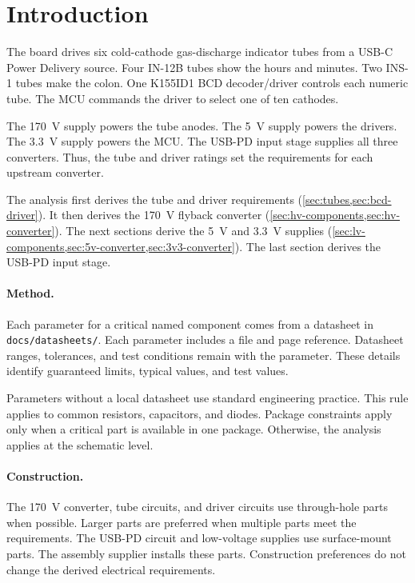 \section{Introduction}
\label{sec:introduction}

The board drives six cold-cathode gas-discharge indicator tubes from a USB-C
Power Delivery source. Four IN-12B tubes show the hours and minutes. Two INS-1
tubes make the colon. One K155ID1 BCD decoder/driver controls each numeric
tube. The MCU commands the driver to select one of ten cathodes.

The 170~V supply powers the tube anodes. The 5~V supply powers the drivers. The
3.3~V supply powers the MCU. The USB-PD input stage supplies all three
converters. Thus, the tube and driver ratings set the requirements for each
upstream converter.

The analysis first derives the tube and driver requirements
(\cref{sec:tubes,sec:bcd-driver}). It then derives the 170~V flyback converter
(\cref{sec:hv-components,sec:hv-converter}). The next sections derive the 5~V
and 3.3~V supplies
(\cref{sec:lv-components,sec:5v-converter,sec:3v3-converter}). The last section
derives the USB-PD input stage.

\paragraph{Method.} Each parameter for a critical named component comes from a
datasheet in \texttt{docs/datasheets/}. Each parameter includes a file and page
reference. Datasheet ranges, tolerances, and test conditions remain with the
parameter. These details identify guaranteed limits, typical values, and test
values.

Parameters without a local datasheet use standard engineering practice. This
rule applies to common resistors, capacitors, and diodes. Package constraints
apply only when a critical part is available in one package. Otherwise, the
analysis applies at the schematic level.

\paragraph{Construction.} The 170~V converter, tube circuits, and driver
circuits use through-hole parts when possible. Larger parts are preferred when
multiple parts meet the requirements. The USB-PD circuit and low-voltage
supplies use surface-mount parts. The assembly supplier installs these parts.
Construction preferences do not change the derived electrical requirements.
